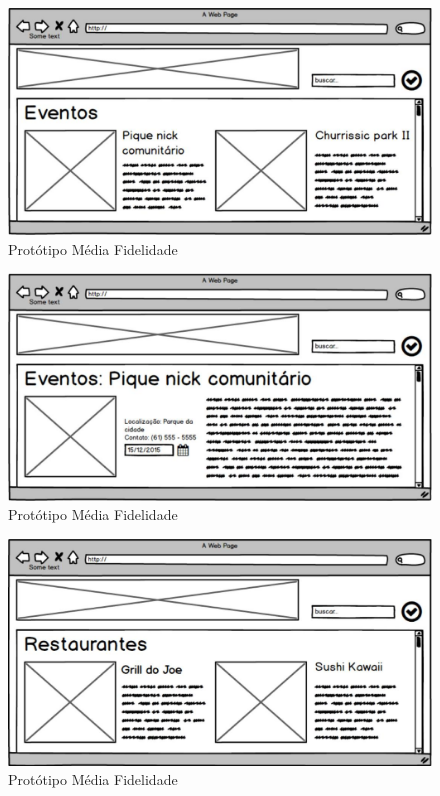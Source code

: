\begin{figure}[H]
	\begin{center}
		\includegraphics[keepaspectratio,scale=0.3]{figuras/media_fidelidade/prototipo2.eps}
		\caption{Protótipo Média Fidelidade}
	\end{center}
\end{figure}

\begin{figure}[H]
	\begin{center}
		\includegraphics[keepaspectratio,scale=0.3]{figuras/media_fidelidade/prototipo3.eps}
		\caption{Protótipo Média Fidelidade}
	\end{center}
\end{figure}

\begin{figure}[H]
	\begin{center}
		\includegraphics[keepaspectratio,scale=0.3]{figuras/media_fidelidade/prototipo4.eps}
		\caption{Protótipo Média Fidelidade}
	\end{center}
\end{figure}

